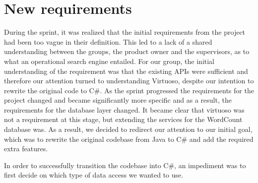 \section{New requirements} \label{ssec:newRequirements}
During the sprint, it was realized that the initial requirements from the \knox{} project had been too vague in their definition. This led to a lack of a shared understanding between the groups, the product owner and the supervisors, as to what an operational search engine entailed. For our group, the initial understanding of the requirement was that the existing APIs were sufficient and therefore our attention turned to understanding Virtuoso, despite our intention to rewrite the original code to C\#. 
As the sprint progressed the requirements for the \knox{} project changed and became significantly more specific and as a result, the requirements for the database layer changed. It became clear that virtuoso was not a requirement at this stage, but extending the services for the WordCount database was. As a result, we decided to redirect our attention to our initial goal, which was to rewrite the original codebase from Java to C\# and add the required extra features.

In order to successfully transition the codebase into C\#, an impediment was to first decide on which type of data access we wanted to use.
